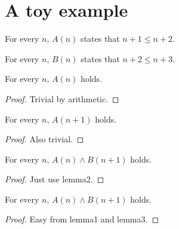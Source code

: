 \chapter{A toy example}

\begin{definition}[Property $A$]\label{def:A}
  For every $n$, $A(n)$ states that $n + 1 \le n + 2$.
\end{definition}

\begin{definition}[Property $B$]\label{def:B}
  For every $n$, $B(n)$ states that $n + 2 \le n + 3$.
\end{definition}

\begin{lemma}\label{lem:lemma1}\leanok
  For every $n$, $A(n)$ holds.
\end{lemma}

\begin{proof}
  Trivial by arithmetic.
\end{proof}

\begin{lemma}\label{lem:lemma2}\leanok
  For every $n$, $A(n+1)$ holds.
\end{lemma}

\begin{proof}
  Also trivial.
\end{proof}

\begin{lemma}\label{lem:lemma3}\leanok
  For every $n$, $A(n) \wedge B(n+1)$ holds.
\end{lemma}

\begin{proof}
  Just use lemma2.
\end{proof}

\begin{lemma}\label{lem:main}\leanok
  For every $n$, $A(n) \wedge B(n+1)$ holds.
\end{lemma}

\begin{proof}
  Easy from lemma1 and lemma3.
\end{proof}
